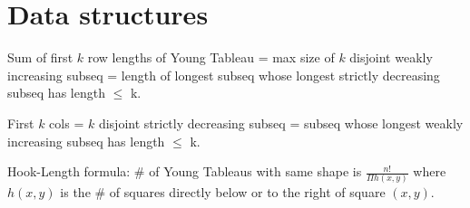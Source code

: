 \chapter{Data structures}


Sum of first $k$ row lengths of Young Tableau = max size of $k$ disjoint weakly increasing subseq = 
length of longest subseq whose longest strictly decreasing subseq has length $\leq$ k. 

First $k$ cols = $k$ disjoint strictly decreasing subseq =
subseq whose longest weakly increasing subseq has length $\leq$ k.

Hook-Length formula: \# of Young Tableaus with same shape is $\frac{n!}{\Pi h(x,y)}$ 
where $h(x,y)$ is the \# of squares directly below or to the right of square $(x,y)$.

\columnbreak

